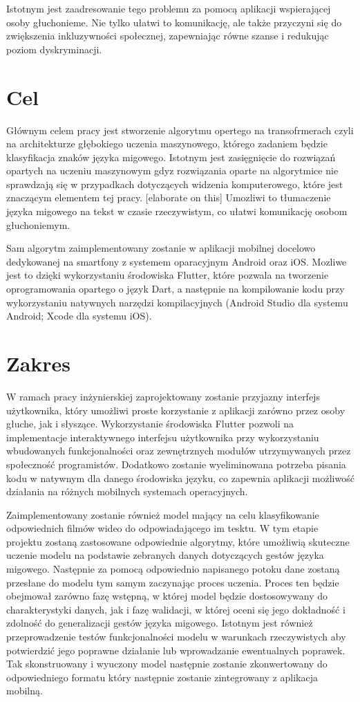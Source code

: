 \documentclass[12pt,a4paper,twoside]{book} %
\begin{document}
Istotnym jest zaadresowanie tego problemu za pomocą aplikacji wspierającej osoby głuchonieme.
Nie tylko ułatwi to komunikację, ale także przyczyni się do zwiększenia inkluzywności społecznej, zapewniając równe szanse i redukując poziom dyskryminacji.


\section{Cel}\label{sec:aim}

Głównym celem pracy jest stworzenie algorytmu opertego na transofrmerach czyli na architekturze głębokiego uczenia maszynowego, którego zadaniem będzie klasyfikacja znaków języka migowego.
Istotnym jest zasięgnięcie do rozwiązań opartych na uczeniu maszynowym gdyz rozwiązania oparte na algorytmice nie sprawdzają się w przypadkach dotyczących widzenia komputerowego, które jest znaczącym elementem tej pracy. [elaborate on this]
Umozliwi to tłumaczenie języka migowego na tekst w czasie rzeczywistym, co ułatwi komunikację osobom głuchoniemym. 

Sam algorytm zaimplementowany zostanie w aplikacji mobilnej docelowo dedykowanej na smartfony z systemem oparacyjnym Android oraz iOS. Mozliwe jest to dzięki wykorzystaniu środowiska Flutter, które pozwala na tworzenie oprogramowania opartego o język Dart, a następnie na kompilowanie kodu przy wykorzystaniu natywnych narzędzi kompilacyjnych (Android Studio dla systemu Android; Xcode dla systemu iOS).

\section{Zakres}\label{sec:scope}

W ramach pracy inżynierskiej zaprojektowany zostanie przyjazny interfejs użytkownika, który umożliwi proste korzystanie z aplikacji zarówno przez osoby głuche, jak i słyszące.
Wykorzystanie środowiska Flutter pozwoli na implementacje interaktywnego interfejsu użytkownika przy wykorzystaniu wbudowanych funkcjonalności oraz zewnętrznych modułów utrzymywanych przez społeczność programistów.
Dodatkowo zostanie wyeliminowana potrzeba pisania kodu w natywnym dla danego środowiska języku, co zapewnia aplikacji możliwość działania na różnych mobilnych systemach operacyjnych.

Zaimplementowany zostanie również model mający na celu klasyfikowanie odpowiednich filmów wideo do odpowiadającego im tesktu.
W tym etapie projektu zostaną zastosowane odpowiednie algorytmy, które umożliwią skuteczne uczenie modelu na podstawie zebranych danych dotyczących gestów języka migowego.
Następnie za pomocą odpowiednio napisanego potoku dane zostaną przesłane do modelu tym samym zaczynając proces uczenia.
Proces ten będzie obejmował zarówno fazę wstępną, w której model będzie dostosowywany do charakterystyki danych, jak i fazę walidacji, w której oceni się jego dokładność i zdolność do generalizacji gestów języka migowego.
Istotnym jest również przeprowadzenie testów funkcjonalności modelu w warunkach rzeczywistych aby potwierdzić jego poprawne działanie lub wprowadzanie ewentualnych poprawek.  
Tak skonstruowany i wyuczony model następnie zostanie zkonwertowany do odpowiedniego formatu który następnie zostanie zintegrowany z aplikacja mobilną.
\end{document}
